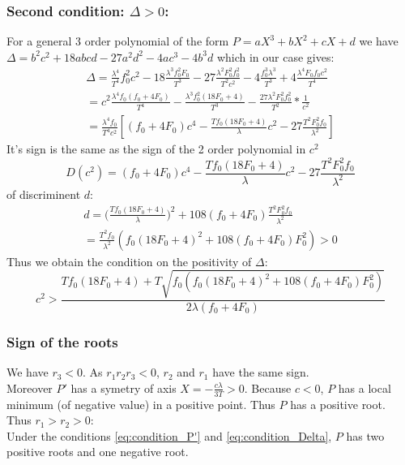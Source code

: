 \documentclass[17pt]{extarticle}
\begin{document}
\subsubsection{Second condition: $\Delta>0$:}
For a general 3 order polynomial of the form $P=aX^3 +bX^2 + cX + d$ we have $\Delta= b^2c^2 +18abcd-27a^2d^2 -4ac^3 -4b^3d$ which in our case gives:
\begin{align*}
	\Delta=\frac{\lambda^4}{T^4}f_0^2c^2 -18 \frac{\lambda^3f_0^2F_0}{T^3}-27 \frac{\lambda^2 F_0^2 f_0^2}{T^2c^2} - 4 \frac{f_0^3\lambda^3}{T^3}+4 \frac{\lambda^4F_0f_0c^2}{T^4} \\ = c^2 \frac{\lambda^4f_0(f_0+4F_0)}{T^4}- \frac{\lambda^3f_0^2(18F_0+4)}{T^3} -\frac{27\lambda^2F_0^2f_0^2}{T^2}* \frac{1}{c^2}\\ 
=	\frac{\lambda^4f_0}{T^4c^2}[(f_0+4F_0)c^4-\frac{Tf_0(18F_0+4)}{\lambda} c^2 - 27 \frac{T^2F_0^2f_0}{\lambda^2}] \end{align*}
It's sign is the same as the sign of the 2 order polynomial in $c^2$ \begin{equation}
	D(c^2)=(f_0+4F_0)c^4-\frac{Tf_0(18F_0+4)}{\lambda} c^2 - 27 \frac{T^2F_0^2f_0}{\lambda^2}
\end{equation} 
of discriminent $d$:
\begin{align*}
	d=\Big(\frac{Tf_0(18F_0+4)}{\lambda} \Big)^2 +108(f_0+4F_0)\frac{T^2F_0^2f_0}{\lambda^2} \\ 
	= \frac{T^2f_0}{\lambda^2}(f_0(18F_0+4)^2+108(f_0+4F_0)F_0^2) >0
\end{align*}
Thus we obtain the condition on the positivity of $\Delta$: 
\begin{equation}\boxed{
	c^2> \frac{Tf_0(18F_0+4)+T\sqrt{f_0(f_0(18F_0+4)^2+108(f_0+4F_0)F_0^2)}}{2\lambda(f_0+4F_0)}
	}\label{eq:condition_Delta}
\end{equation}
\subsubsection{Sign of the roots}
We have $r_3<0$. As $r_1r_2r_3<0$,  $r_2$ and $r_1$ have the same sign.\\
Moreover $P'$ has a symetry of axis $X=-\frac{c\lambda}{3T}>0$. Because $c<0$, $P$ has a local minimum (of negative value) in a positive point. Thus $P$ has a positive root.\\
Thus $r_1>r_2>0$: \\ 
Under the conditions \eqref{eq:condition_P'} and \eqref{eq:condition_Delta}, $P$ has two positive roots and one negative root.
\end{document}
